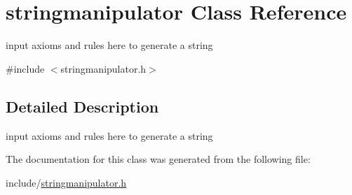 \hypertarget{classstringmanipulator}{
\section{stringmanipulator Class Reference}
\label{classstringmanipulator}
}


input axioms and rules here to generate a string  


{\ttfamily \#include $<$stringmanipulator.h$>$}

\subsection{Detailed Description}
input axioms and rules here to generate a string 

The documentation for this class was generated from the following file:\begin{DoxyCompactItemize}
\item 
include/\hyperlink{stringmanipulator_8h}{stringmanipulator.h}\end{DoxyCompactItemize}
